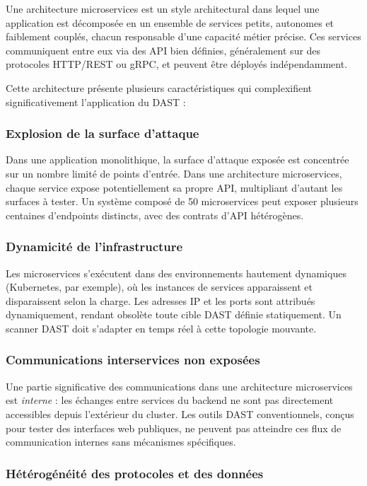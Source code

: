 Une architecture microservices est un style architectural dans lequel une
application est décomposée en un ensemble de services petits, autonomes et
faiblement couplés, chacun responsable d'une capacité métier précise.
Ces services communiquent entre eux via des API bien définies, généralement
sur des protocoles HTTP/REST ou gRPC, et peuvent être déployés indépendamment.

Cette architecture présente plusieurs caractéristiques qui complexifient
significativement l'application du DAST :

\subsubsection{Explosion de la surface d'attaque}

Dans une application monolithique, la surface d'attaque exposée est concentrée
sur un nombre limité de points d'entrée. Dans une architecture microservices,
chaque service expose potentiellement sa propre API, multipliant d'autant les
surfaces à tester. Un système composé de 50 microservices peut exposer plusieurs
centaines d'endpoints distincts, avec des contrats d'API hétérogènes.

\subsubsection{Dynamicité de l'infrastructure}

Les microservices s'exécutent dans des environnements hautement dynamiques
(Kubernetes, par exemple), où les instances de services apparaissent et
disparaissent selon la charge. Les adresses IP et les ports sont attribués
dynamiquement, rendant obsolète toute cible DAST définie statiquement.
Un scanner DAST doit s'adapter en temps réel à cette topologie mouvante.

\subsubsection{Communications interservices non exposées}

Une partie significative des communications dans une architecture microservices
est \textit{interne} : les échanges entre services du backend ne sont pas
directement accessibles depuis l'extérieur du cluster. Les outils DAST
conventionnels, conçus pour tester des interfaces web publiques, ne peuvent
pas atteindre ces flux de communication internes sans mécanismes spécifiques.

\subsubsection{Hétérogénéité des protocoles et des données}

